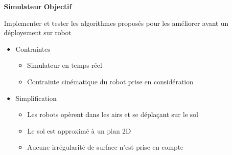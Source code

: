 \documentclass[aspectratio=169,10pt]{beamer}
\begin{document}
\begin{frame}{\textbf{Simulateur}}
	\textbf{Objectif}

	\vspace{0.5em}

	Implementer et tester les algorithmes proposés pour les améliorer avant un déployement sur robot
	
	\vspace{0.5em}

	\begin{itemize}
		\item Contraintes
		\begin{itemize}
			\item Simulateur en temps réel
			\vspace{0.2cm}
			\item Contrainte cinématique du robot prise en considération
		\end{itemize}
		\vspace{0.2cm}
		\item Simplification
		\begin{itemize}
			\item Les robots opèrent dans les airs et se déplaçant sur le sol
			\vspace{0.2cm}
			\item Le sol est approximé à un plan 2D
			\vspace{0.2cm}
			\item Aucune irrégularité de surface n'est prise en compte
		\end{itemize}
	\end{itemize}
\end{frame}
\end{document}

